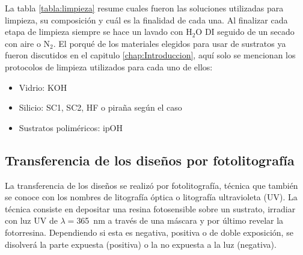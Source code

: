 							
			La tabla \ref{tabla:limpieza} resume cuales fueron las soluciones utilizadas para limpieza, su composición y cuál es la finalidad de cada una. Al finalizar cada etapa de limpieza siempre se hace un lavado con H$_2$O DI seguido de un secado con aire o N$_2$. El porqué de los materiales elegidos para usar de sustratos ya fueron discutidos en el capitulo \ref{chap:Introduccion}, aquí solo se mencionan los protocolos de limpieza\cite{Franssila2004,Kern1990} utilizados para cada uno de ellos:

				\begin{itemize}
					\item{Vidrio: KOH}
					\item{Silicio: SC1, SC2, HF o piraña según el caso}
					\item{Sustratos poliméricos: ipOH}
				\end{itemize}

    \subsection{Transferencia de los diseños por fotolitografía}\label{sec:fotolito}

		La transferencia de los diseños se realizó por fotolitografía, técnica que también se conoce con los nombres de litografía óptica o litografía ultravioleta (UV). La técnica consiste en depositar una resina fotosensible sobre un sustrato, irradiar con luz UV de $\lambda\!=$\SI{365}{nm} a través de una máscara y por último revelar la fotorresina. Dependiendo si esta es negativa, positiva o de doble exposición, se disolverá la parte expuesta (positiva) o la no expuesta a la luz (negativa). \cite{Jaeger2001,Franssila2004,Mack2007,Mack2006}
	
